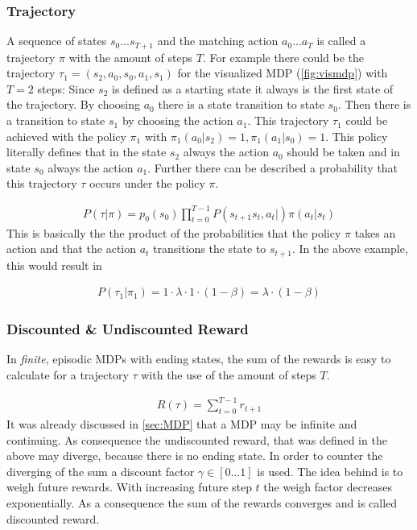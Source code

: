 \subsubsection{Trajectory}
A sequence of states $s_0 ... s_{T+1}$ and the matching action $a_0 ... a_T$ is called a trajectory $\pi$ with the amount of steps $T$.
For example there could be the trajectory $\tau_1 = (s_2, a_0, s_0, a_1, s_1)$ for the visualized MDP (\cref{fig:vismdp}) with $T=2$ steps:
Since $s_2$ is defined as a starting state it always is the first state of the trajectory. By choosing $a_0$ there is a state transition to state $s_0$. Then there is a transition to state $s_1$ by choosing the action $a_1$. This trajectory $\tau_1$ could be achieved with the policy $\pi_1$ with $\pi_1(a_0|s_2) = 1, \pi_1(a_1|s_0) = 1$. This policy literally defines that in the state $s_2$ always the action $a_0$ should be taken and in state $s_0$ always the action $a_1$.
Further there can be described a probability that this trajectory $\tau$ occurs under the policy $\pi$.

\begin{align}
	P(\tau| \pi) = p_0(s_0)  \prod_{t=0}^{T-1} P(s_{t+1}s_t,a_t|) \pi (a_t|s_t) 
\end{align}
\newline
This is basically the the product of the probabilities that the policy $\pi$ takes an action and that the action $a_t$ transitions the state to $s_{t+1}$. In the above example, this would result in

\begin{align*}
	P(\tau_1|\pi_1) = 1 \cdot \lambda \cdot 1 \cdot (1-\beta) = \lambda \cdot (1-\beta)
\end{align*} 

\newpage

\subsubsection{Discounted \& Undiscounted Reward}
In \emph{finite}, episodic MDPs with ending states, the sum of the rewards is easy to calculate for a trajectory $\tau$ with the use of the amount of steps $T$.

\begin{align}
	R(\tau) = \sum_{t=0}^{T-1}r_{t+1}
\end{align}
\newline
It was already discussed in \cref{sec:MDP} that a MDP may be infinite and continuing. As consequence the undiscounted reward, that was defined in the above may diverge, because there is no ending state. In order to counter the diverging of the sum a discount factor $\gamma \in [0...1]$ is used. The idea behind is to weigh future rewards. With increasing future step $t$ the weigh factor decreases exponentially. As a consequence the sum of the rewards converges and is called discounted reward.

